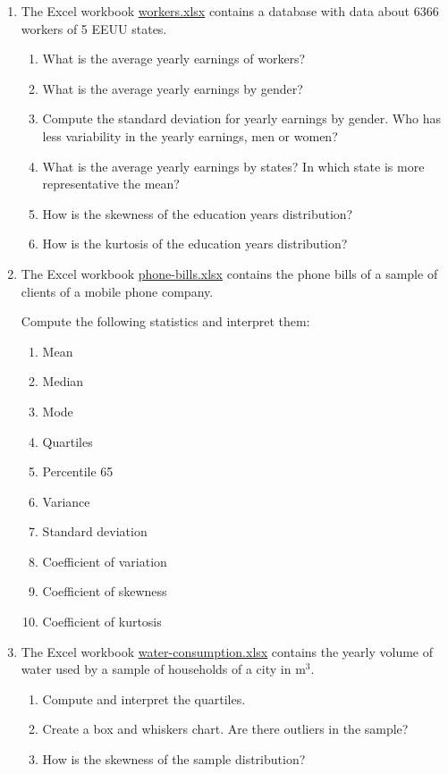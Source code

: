 \begin{enumerate}[leftmargin=*,resume]
\item The Excel workbook
\href{http://aprendeconalf.es/office/excel/exercises/databases/workers.xlsx}{\textsf{workers.xlsx}}
contains a database with data about 6366 workers of 5 EEUU states.
\begin{enumerate}
\item What is the average yearly earnings of workers?
\item What is the average yearly earnings by gender?
\item Compute the standard deviation for yearly earnings by gender.
Who has less variability in the yearly earnings, men or women?
\item What is the average yearly earnings by states?
In which state is more representative the mean?
\item How is the skewness of the education years distribution?
\item How is the kurtosis of the education years distribution?
\end{enumerate}


\item The Excel workbook
\href{http://aprendeconalf.es/office/excel/exercises/descriptive-statistics/phone-bills.xlsx}{\textsf{phone-bills.xlsx}}
contains the phone bills of a sample of clients of a mobile phone company. 

Compute the following statistics and interpret them:
\begin{enumerate}
\item Mean
\item Median
\item Mode
\item Quartiles
\item Percentile 65
\item Variance
\item Standard deviation
\item Coefficient of variation
\item Coefficient of skewness
\item Coefficient of kurtosis
\end{enumerate}

\item The Excel workbook \href{http://aprendeconalf.es/office/excel/exercises/descriptive-statistics/water-consumption.xlsx}{\textsf{water-consumption.xlsx}}
contains the yearly volume of water used by a sample of households of a city in m$^3$. 

\begin{enumerate}
\item Compute and interpret the quartiles.
\item Create a box and whiskers chart. 
Are there outliers in the sample?
\item How is the skewness of the sample distribution?
\end{enumerate}


\end{enumerate}
